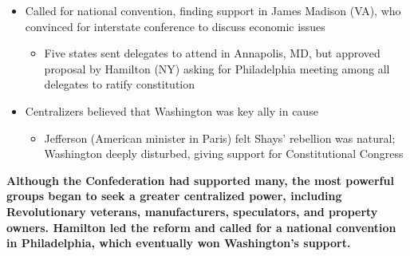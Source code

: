 \documentclass[a4paper]{article}
\begin{document}
{\begin{itemize}
\begin{itemize}
            \item Called for national convention, finding support in James Madison (VA), who convinced for interstate conference to discuss economic issues
            \begin{itemize}
                \item Five states sent delegates to attend in Annapolis, MD, but approved proposal by Hamilton (NY) asking for Philadelphia meeting among all delegates to ratify constitution
            \end{itemize}
            \item Centralizers believed that Washington was key ally in cause
            \begin{itemize}
                \item Jefferson (American minister in Paris) felt Shays' rebellion was natural; Washington deeply disturbed, giving support for Constitutional Congress
            \end{itemize}
        \end{itemize}
    \end{itemize}
        \textbf{Although the Confederation had supported many, the most powerful groups began to seek a greater centralized power, including Revolutionary veterans, manufacturers, speculators, and property owners. Hamilton led the reform and called for a national convention in Philadelphia, which eventually won Washington's support.}}
\end{document}
